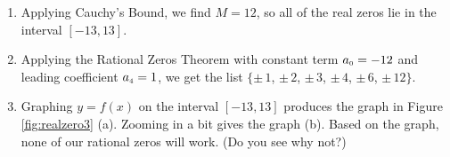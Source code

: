 {
\begin{enumerate}

\item  Applying Cauchy's Bound, we find $M = 12$, so all of the real zeros lie in the interval $[-13,13]$.

\item  Applying the Rational Zeros Theorem with constant term $a_{\mbox{\tiny$0$}} = -12$ and leading coefficient $a_{\mbox{\tiny$4$}} = 1$, we get the list $\{\pm \, 1$, $\pm \, 2$, $\pm \, 3$, $\pm \, 4$, $\pm \, 6$, $\pm \, 12\}$.

\item  Graphing $y=f(x)$ on the interval $[-13,13]$ produces the graph in Figure \ref{fig:realzero3} (a). Zooming in a bit gives the graph (b).  Based on the graph, none of our rational zeros will work. (Do you see why not?)

{
}


\end{enumerate}}
